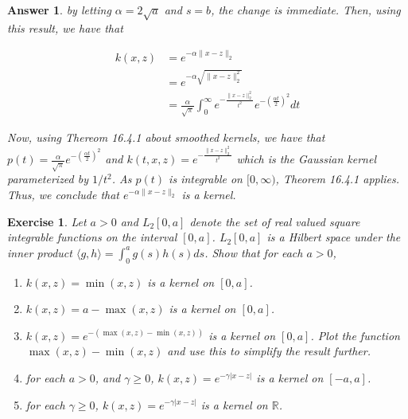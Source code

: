 \documentclass[12pt]{article}
\theoremstyle{colon}
\newtheorem{exercise}{Exercise}
\newtheorem*{answer}{Answer}
\begin{document}
\begin{answer}
  by letting $\alpha = 2 \sqrt{a}$ and $s = b$, the change is immediate. Then, using this result, we have that

  \begin{align*}
    k(x,z) &= e^{-\alpha \lVert x - z \rVert_2} \\
    &= e^{-\alpha \sqrt{\lVert x - z \rVert_2^2}} \\
    &= \frac{\alpha}{\sqrt{\pi}} \int_0^\infty e^{-\frac{\lVert x - z \rVert_2^2}{t^2}} e^{-(\frac{\alpha t}{2})^2} dt
  \end{align*}

  Now, using Thereom 16.4.1 about smoothed kernels, we have that $p(t) = \frac{\alpha}{\sqrt{\pi}} e^{-(\frac{\alpha t}{2})^2}$ and $k(t, x, z) = e^{-\frac{\lVert x - z \rVert_2^2}{t^2}}$ which is the Gaussian kernel parameterized by $1/t^2$. As $p(t)$ is integrable on $[0, \infty)$, Theorem 16.4.1 applies. Thus, we conclude that $e^{-\alpha \lVert x - z \rVert_2}$ is a kernel.
\end{answer}

\clearpage

\begin{exercise}
  Let $a > 0$ and $L_2 [0,a]$ denote the set of real valued square integrable functions on the interval $[0,a]$. $L_2[0,a]$ is a Hilbert space under the inner product $\langle g, h \rangle = \int_0^a g(s) h(s) ds$. Show that for each $a > 0$,

  \begin{enumerate}[label=\alph*)]
    \item $k(x,z) = \min(x,z)$ is a kernel on $[0,a]$.

    \item $k(x,z) = a - \max(x,z)$ is a kernel on $[0,a]$.

    \item $k(x,z) = e^{-(\max(x,z) - \min(x,z))}$ is a kernel on $[0,a]$. Plot the function $\max(x,z) - \min(x,z)$ and use this to simplify the result further.

    \item for each $a > 0$, and $\gamma \geq 0$, $k(x,z) = e^{-\gamma \lvert x - z \rvert}$ is a kernel on $[-a, a]$.

    \item for each $\gamma \geq 0$, $k(x,z) = e^{-\gamma \lvert x - z \rvert}$ is a kernel on $\mathbb{R}$.
  \end{enumerate}
\end{exercise}
\end{document}
